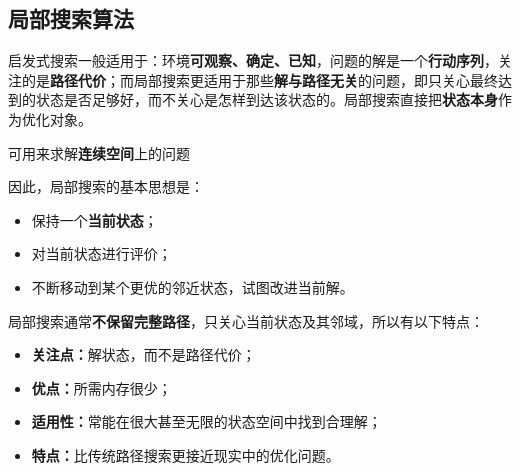 \documentclass[../main.tex]{subfiles}
\begin{document}
\subsection{局部搜索算法}\label{sec:local-search}

启发式搜索一般适用于：环境\textbf{可观察、确定、已知}，问题的解是一个\textbf{行动序列}，关注的是\textbf{路径代价}；而局部搜索更适用于那些\textbf{解与路径无关}的问题，即只关心最终达到的状态是否足够好，而不关心是怎样到达该状态的。局部搜索直接把\textbf{状态本身}作为优化对象。

可用来求解\textbf{连续空间}上的问题

因此，局部搜索的基本思想是：
\begin{itemize}
    \item 保持一个\textbf{当前状态}；
    \item 对当前状态进行评价；
    \item 不断移动到某个更优的邻近状态，试图改进当前解。
\end{itemize}

局部搜索通常\textbf{不保留完整路径}，只关心当前状态及其邻域，所以有以下特点：
\begin{itemize}
    \item \textbf{关注点：}解状态，而不是路径代价；
    \item \textbf{优点：}所需内存很少；
    \item \textbf{适用性：}常能在很大甚至无限的状态空间中找到合理解；
    \item \textbf{特点：}比传统路径搜索更接近现实中的优化问题。
\end{itemize}
\end{document}
